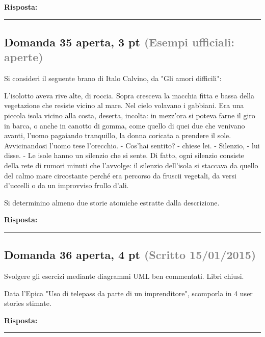 \documentclass[a4paper,11pt]{article}
\begin{document}
\vspace{0.2cm}
\noindent\textbf{Risposta:}\par
\vspace{4cm}\hrule


\subsection*{Domanda 35 \hfill {\small aperta, 3 pt \textcolor{gray}{(Esempi ufficiali: aperte)}}}
\begin{tcolorbox}[colback=gray!8,colframe=gray!50,title=Contesto]
Si consideri il seguente brano di Italo Calvino, da "Gli amori difficili":

L'isolotto aveva rive alte, di roccia. Sopra cresceva la macchia fitta e bassa della vegetazione che resiste vicino al mare. Nel cielo volavano i gabbiani. Era una piccola isola vicino alla costa, deserta, incolta: in mezz'ora si poteva farne il giro in barca, o anche in canotto di gomma, come quello di quei due che venivano avanti, l'uomo pagaiando tranquillo, la donna coricata a prendere il sole. Avvicinandosi l'uomo tese l'orecchio. - Cos'hai sentito? - chiese lei. - Silenzio, - lui disse. - Le isole hanno un silenzio che si sente. Di fatto, ogni silenzio consiste della rete di rumori minuti che l'avvolge: il silenzio dell'isola si staccava da quello del calmo mare circostante perché era percorso da fruscii vegetali, da versi d'uccelli o da un improvviso frullo d'ali.
\end{tcolorbox}
Si determinino almeno due storie atomiche estratte dalla descrizione.

\vspace{0.2cm}
\noindent\textbf{Risposta:}\par
\vspace{4cm}\hrule


\subsection*{Domanda 36 \hfill {\small aperta, 4 pt \textcolor{gray}{(Scritto 15/01/2015)}}}
\begin{tcolorbox}[colback=gray!8,colframe=gray!50,title=Contesto]
Svolgere gli esercizi mediante diagrammi UML ben commentati. Libri chiusi.
\end{tcolorbox}
Data l'Epica "Uso di telepass da parte di un imprenditore", scomporla in 4 user stories stimate.

\vspace{0.2cm}
\noindent\textbf{Risposta:}\par
\vspace{4cm}\hrule
\end{document}
